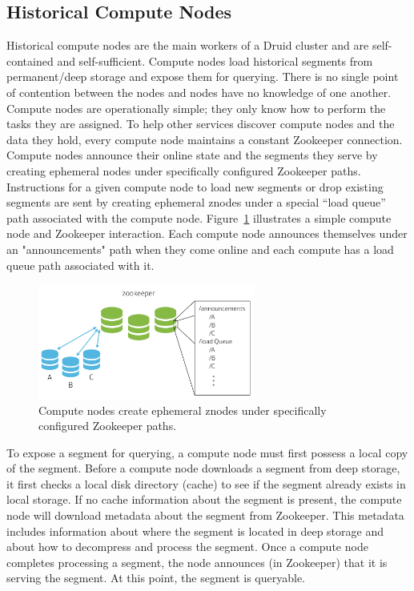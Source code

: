 \documentclass{vldb}
\begin{document}
\subsection{Historical Compute Nodes}
Historical compute nodes are the main workers of a Druid cluster and
are self-contained and self-sufficient. Compute nodes load historical
segments from permanent/deep storage and expose them for
querying. There is no single point of contention between the nodes and
nodes have no knowledge of one another. Compute nodes are
operationally simple; they only know how to perform the tasks they are
assigned. To help other services discover compute nodes and the data
they hold, every compute node maintains a constant Zookeeper
connection. Compute nodes announce their online state and the segments
they serve by creating ephemeral nodes under specifically configured
Zookeeper paths. Instructions for a given compute node to load new
segments or drop existing segments are sent by creating ephemeral
znodes under a special “load queue” path associated with the compute
node. Figure~\ref{fig:zookeeper} illustrates a simple compute node and Zookeeper interaction. 
Each compute node announces themselves under an "announcements" path when they come online
and each compute has a load queue path associated with it.

\begin{figure}
\centering
\includegraphics[width = 2.8in]{zookeeper}
\caption{Compute nodes create ephemeral znodes under specifically configured Zookeeper paths.}
\label{fig:zookeeper}
\end{figure}

To expose a segment for querying, a compute node must first possess a
local copy of the segment. Before a compute node downloads a segment
from deep storage, it first checks a local disk directory (cache) to
see if the segment already exists in local storage. If no cache
information about the segment is present, the compute node will
download metadata about the segment from Zookeeper. This metadata
includes information about where the segment is located in deep
storage and about how to decompress and process the segment. Once a
compute node completes processing a segment, the node announces (in
Zookeeper) that it is serving the segment. At this point, the segment
is queryable.
\end{document}
